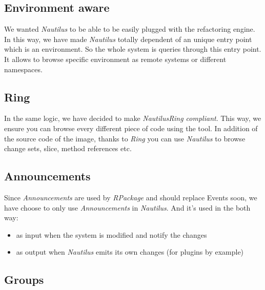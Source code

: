 \documentclass[a4paper,10pt,twoside]{book}
\newcommand\nautilus{\emph{Nautilus}\xspace}
\begin{document}
\subsection*{Environment aware}

We wanted \nautilus to be able to be easily plugged with the refactoring engine. In this way, we have made \nautilus totally dependent of an unique entry point which is an environment. So the whole system is queries through this entry point. It allows to browse specific environment as remote systems or different namespaces.

\subsection*{Ring}

In the same logic, we have decided to make \nautilus \emph{Ring compliant}. This way, we ensure you can browse every different piece of code using the tool. In addition of the source code of the image, thanks to \emph{Ring} you can use \nautilus to browse change sets, slice, method references etc.

\subsection*{Announcements}

Since \emph{Announcements} are used by \emph{RPackage} and should replace Events soon, we have choose to only use \emph{Announcements} in \nautilus. And it's used in the both way:
\begin{itemize}
\item as input when the system is modified and notify the changes
	\item as output when \nautilus emits its own changes (for plugins by example)
\end{itemize}

\subsection*{Groups}
\end{document}

